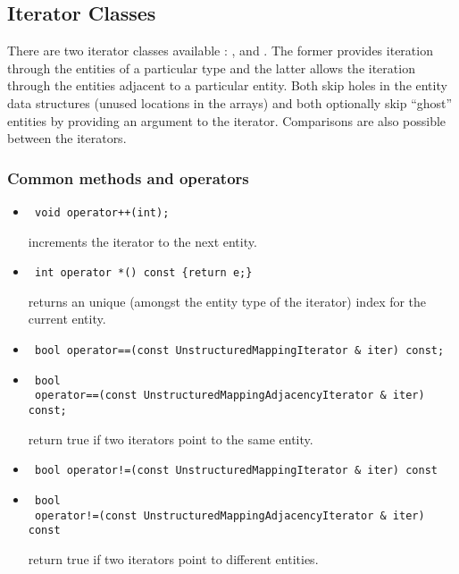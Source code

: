 \subsection{Iterator Classes}
There are two iterator classes available : \umapI, and \forceb \umapAI.  The former 
provides iteration through the entities of a particular type and the latter
allows the iteration through the entities adjacent to a particular entity.
Both skip holes in the entity data structures (unused locations in the arrays) and
both optionally skip ``ghost'' entities by providing an argument to the iterator. 
Comparisons are also possible between the iterators.
\subsubsection{Common methods and operators}
\begin{itemize}
\item \begin{verbatim} void operator++(int); \end{verbatim}
increments the iterator to the next entity.

\item \begin{verbatim} int operator *() const {return e;} \end{verbatim}
returns an unique (amongst the entity type of the iterator) index for the current entity.

\item \begin{verbatim} bool operator==(const UnstructuredMappingIterator & iter) const;\end{verbatim}
\item \begin{verbatim} 
 bool 
 operator==(const UnstructuredMappingAdjacencyIterator & iter) const;\end{verbatim}
return true if two iterators point to the same entity.

\item \begin{verbatim} bool operator!=(const UnstructuredMappingIterator & iter) const \end{verbatim}
\item \begin{verbatim} 
 bool 
 operator!=(const UnstructuredMappingAdjacencyIterator & iter) const \end{verbatim}
return true if two iterators point to different entities.

\end{itemize}

